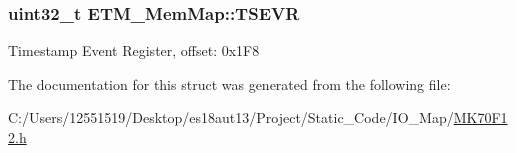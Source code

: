 \subsubsection[{T\+S\+E\+V\+R}]{\setlength{\rightskip}{0pt plus 5cm}uint32\+\_\+t E\+T\+M\+\_\+\+Mem\+Map\+::\+T\+S\+E\+V\+R}\label{struct_e_t_m___mem_map_ad30bdaff018bc7d3b586ce0ca41dfd9b}
Timestamp Event Register, offset\+: 0x1\+F8 

The documentation for this struct was generated from the following file\+:\begin{DoxyCompactItemize}
\item 
C\+:/\+Users/12551519/\+Desktop/es18aut13/\+Project/\+Static\+\_\+\+Code/\+I\+O\+\_\+\+Map/\hyperlink{_m_k70_f12_8h}{M\+K70\+F12.\+h}\end{DoxyCompactItemize}
